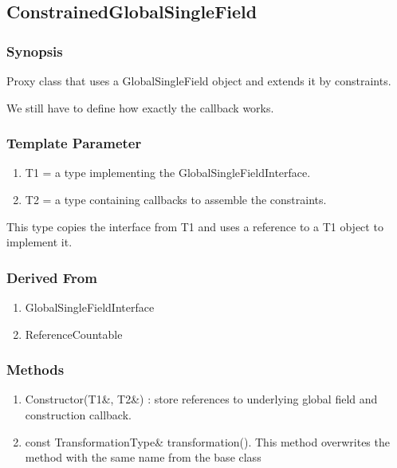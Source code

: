 \documentclass[11pt,a4paper,DIV11,%
notitlepage,oneside,abstracton,%
bibtotoc]{scrartcl}
\begin{document}
\subsection{ConstrainedGlobalSingleField}

\subsubsection{Synopsis}

Proxy class that uses a GlobalSingleField object and extends it by
constraints. 

We still have to define how exactly the callback works.

\subsubsection{Template Parameter}

\begin{enumerate}[1)]
\item T1 = a type implementing the GlobalSingleFieldInterface.
\item T2 = a type containing callbacks to assemble the constraints.
\end{enumerate}

This type copies the interface from T1 and uses a reference to a T1
object to implement it. 

\subsubsection{Derived From}

\begin{enumerate}[1)]
\item GlobalSingleFieldInterface
\item ReferenceCountable
\end{enumerate}


\subsubsection{Methods}

\begin{enumerate}[1)]
\item Constructor(T1\&, T2\&) : store references to underlying global
  field and construction callback.
\item const TransformationType\& transformation(). This method
  overwrites the method with the same name from the base class
\end{enumerate}
\end{document}
